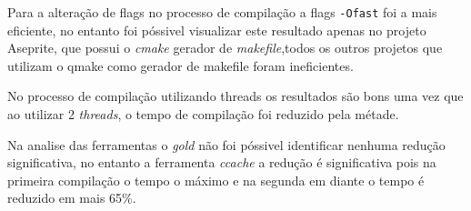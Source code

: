     Para a alteração de flags no processo de compilação a flags \texttt{-Ofast} foi a mais eficiente,
 no entanto foi póssivel visualizar este resultado apenas no projeto Aseprite, que possui o
 \textit{cmake} gerador de \textit{makefile},todos os outros projetos que utilizam o qmake
 como gerador de makefile foram ineficientes.

    No processo de compilação utilizando threads os resultados são bons uma vez que
 ao utilizar 2 \textit{threads}, o tempo de compilação foi reduzido pela métade.

    Na analise das ferramentas o \textit{gold} não foi póssivel identificar nenhuma redução significativa,
 no entanto a ferramenta \textit{ccache} a redução é significativa pois na primeira compilação o tempo o máximo
 e na segunda em diante o tempo é reduzido em mais 65\%.
